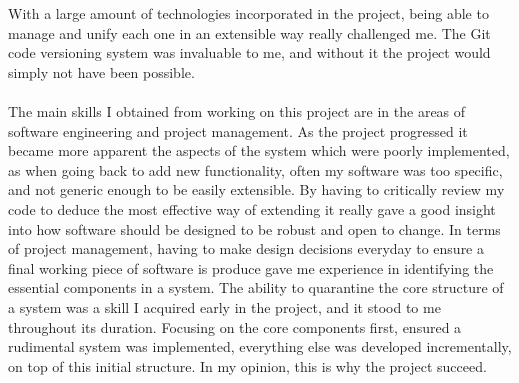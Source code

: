 \documentclass{article}
\begin{document}
With a large amount of technologies incorporated in the project, being able to manage and unify each one in an extensible way really challenged me. The Git code versioning system was invaluable to me, and without it the project would simply not have been possible. \\\\
The main skills I obtained from working on this project are in the areas of software engineering and project management. As the project progressed it became more apparent the aspects of the system which were poorly implemented, as when going back to add new functionality, often my software was too specific, and not generic enough to be easily extensible. By having to critically review my code to deduce the most effective way of extending it really gave a good insight into how software should be designed to be robust and open to change. 
In terms of project management, having to make design decisions everyday to ensure a final working piece of software is produce gave me experience in identifying the essential components in a system. The ability to quarantine the core structure of a system was a skill I acquired early in the project, and it stood to me throughout its duration. Focusing on the core components first, ensured a rudimental system was implemented, everything else was developed incrementally, on top of this initial structure. In my opinion, this is why the project succeed. 
\end{document}
